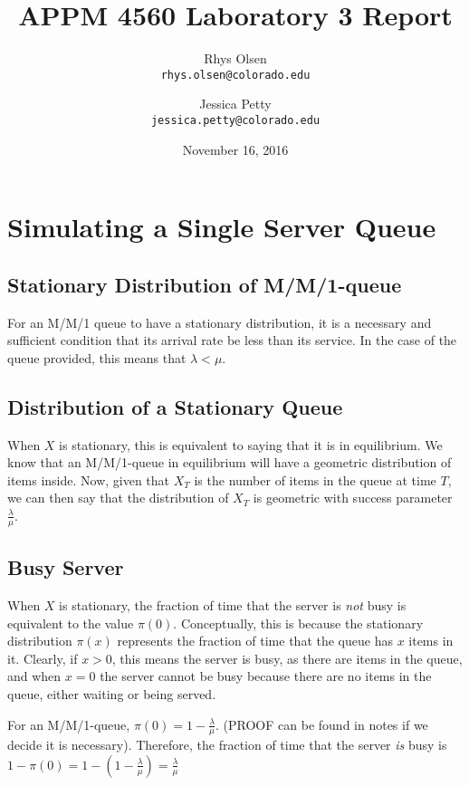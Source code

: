 \documentclass[11pt, oneside]{article}
\title{APPM 4560 Laboratory 3 Report}
\author{Rhys Olsen\\
\texttt{rhys.olsen@colorado.edu}
 \and Jessica Petty\\
 \texttt{jessica.petty@colorado.edu}
 }
\date{November 16, 2016}
\begin{document}
\maketitle
\section{Simulating a Single Server Queue}
\subsection{Stationary Distribution of M/M/1-queue}
For an M/M/1 queue to have a stationary distribution, it is a necessary and sufficient condition that its arrival rate be less than its service. In the case of the queue provided, this means that $\lambda < \mu$.

\subsection{Distribution of a Stationary Queue}
When $X$ is stationary, this is equivalent to saying that it is in equilibrium. We know that an M/M/1-queue in equilibrium will have a geometric distribution of items inside. Now, given that $X_T$ is the number of items in the queue at time $T$, we can then say that the distribution of $X_T$ is geometric with success parameter $\frac{\lambda}{\mu}$.

\subsection{Busy Server}
When $X$ is stationary, the fraction of time that the server is \textit{not} busy is equivalent to the value $\pi(0)$. Conceptually, this is because the stationary distribution $\pi(x)$ represents the fraction of time that the queue has $x$ items in it. Clearly, if $x > 0$, this means the server is busy, as there are items in the queue, and when $x=0$ the server cannot be busy because there are no items in the queue, either waiting or being served.

For an M/M/1-queue, $\pi(0)=1-\frac{\lambda}{\mu}$. (PROOF can be found in notes if we decide it is necessary). Therefore, the fraction of time that the server \textit{is} busy is $1-\pi(0)=1-(1-\frac{\lambda}{\mu})=\frac{\lambda}{\mu}$

\subsection{}
\subsection{}
\subsection{}
\subsection{}
\subsection{}
\subsection{}
\subsection{}
\end{document}
